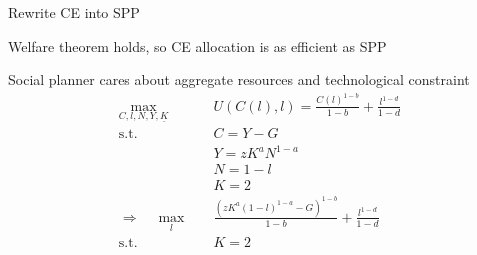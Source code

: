 \documentclass[11pt,aspectratio=169,usenames,dvipsnames]{beamer}
\let\tempone\itemize
\let\temptwo\enditemize
\renewenvironment{itemize}{\tempone\addtolength{\itemsep}{\fill}}{\temptwo}
\begin{document}
\begin{frame}{Rewrite CE into SPP}
\label{slide:Rewrite_CE_into_SPP}
    \begin{itemize}
        \item Welfare theorem holds, so CE allocation is as efficient as SPP
        \item Social planner cares about \alert{aggregate resources} and \alert{technological constraint}
        \begin{align}
                \max_{C, l, N, Y, \underline{K}} \quad
                    & U( C( l ), l ) = \frac{C( l )^{1-b}}{1-b} + \frac{l^{1-d}}{1-d}
                    \tag{utility function}
                \\
                \text{s.t.} \quad
                    & C = Y - G
                    \tag{aggregate resource constraint}
                \\
                    & Y = z K^{a}N^{1-a}
                    \tag{production constraint}
                \\
                    & N = 1 - l
                    \tag{time constraint}
                \\
                    & K = 2
                    \tag{capital constraint}
                \\
                \Rightarrow \quad \max_{l} \quad
                    & \frac{(z K^{a} ( 1-l )^{1-a} - G)^{1-b}}{1-b} + \frac{l^{1-d}}{1-d}
                \\
                \text{s.t.} \quad
                    & K = 2
        \end{align}

    \end{itemize}

\end{frame}
\end{document}
